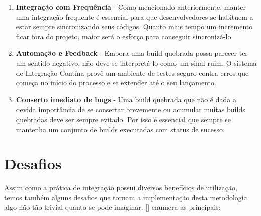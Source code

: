 \documentclass[11pt,oneside]{book}
\begin{document}
\begin{enumerate}

\item \textbf{Integração com Frequência} - Como mencionado anteriormente, manter uma integração frequente é essencial para que desenvolvedores se habituem a estar sempre sincronizando seus códigos. Quanto mais tempo um incremento ficar fora do projeto, maior será o esforço para conseguir sincronizá-lo.

\item \textbf{Automação e Feedback} - Embora uma build quebrada possa parecer ter um sentido negativo, não deve-se interpretá-lo como um sinal ruim. O sistema de Integração Contína provê um ambiente de testes seguro contra erros que começa no início do processo e se extender até o seu lançamento.

\item \textbf{Conserto imediato de bugs} - Uma build quebrada que não é dada a devida importância de se consertar brevemente ou acumular muitas builds quebradas deve ser sempre evitado. Por isso é essencial que sempre se mantenha um conjunto de builds executadas com status de sucesso.  


\end{enumerate}


\section{Desafios}

Assim como a prática de integração possui diversos benefícios de utilização, temos também alguns desafios que tornam a implementação desta metodologia algo não tão trivial quanto se pode imaginar. [] enumera as principais:
\end{document}
